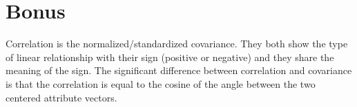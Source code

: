 \documentclass[11pt]{article}
\begin{document}
\section{Bonus}
\label{sec:org2fc83fd}
Correlation is the normalized/standardized covariance. They both show the type of linear
relationship with their sign (positive or negative) and they share the meaning
of the sign. The significant difference between correlation and covariance is
that the correlation is equal to the cosine of the angle between the two centered
attribute vectors.
\end{document}
